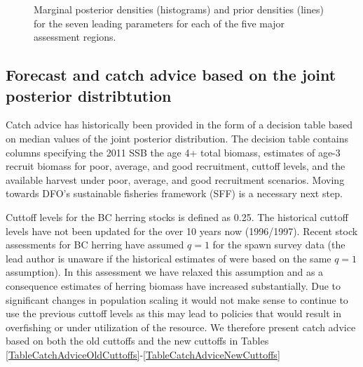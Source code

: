 \begin{figure}[!tbp]

	\caption{Marginal posterior densities (histograms) and prior densities (lines) for the seven leading parameters for each of the five major assessment regions.}\label{PartII:MCMC:Marginals}
\end{figure}



\subsection{Forecast and catch advice based on the joint posterior distribtution} \label{Section:Forecast}

Catch advice has historically been provided in the form of a decision table based on median values of the joint posterior distribution.  The decision table contains columns specifying the 2011 SSB the age 4+ total biomass, estimates of age-3 recruit biomass for poor, average, and good recruitment, cuttoff levels, and the available harvest under poor, average, and good recruitment scenarios.  Moving towards DFO's sustainable fisheries framework  (SFF) is a necessary next step.

Cuttoff levels for the BC herring stocks is defined as 0.25\bo. The historical cuttoff levels have not been updated for the over 10 years now (1996/1997).  Recent stock assessments for BC herring have assumed $q=1$ for the spawn survey data (the lead author is unaware if the historical estimates of \bo were based on the same $q=1$ assumption).  In this assessment we have relaxed this assumption and as a consequence estimates of herring biomass have increased substantially.  Due to significant changes in population scaling it would not make sense to continue to use the previous cuttoff levels as this may lead to policies that would result in overfishing or under utilization of the resource.  We therefore present catch advice based on both the old cuttoffs and the new cuttoffs in Tables \ref{TableCatchAdviceOldCuttoffs}-\ref{TableCatchAdviceNewCuttoffs} 

